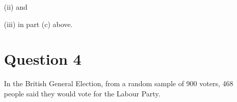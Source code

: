 \documentclass[]{report}
\begin{document}
\begin{enumerate}[(i)]
\begin{itemize}
	
	(c)	An assembly plant has two suppliers, one based in England (E) and the other in Spain (S).  
	60%
	The defect rate in the English plant is 5%
	
	\begin{itemize}
		\item[(i)]	If a component is randomly selected from the production floor in Ireland what is the probability that it will fail?
		\item[(ii)]	If a motherboard fails what is the probability that the component which caused the failure was sourced in England?
	\end{itemize}
	
	
	

	
	
	(c)	XYZ Ltd supplies motherboards to Dell.  You are a production manager with Dell.  There is a constant probability of 0.4 that a board will be defective.  You select 100 boards at random.  Using the log tables for the binomial distribution what is the probability that
	
	\begin{itemize}
		\item[(i)] 0 boards will be defective?
		\item[(ii)] 2 or more boards will be defective?
		\item[(iii)]	5 or less boards will be defective?
	\end{itemize}
	(d)	Use the normal approximation to the binomial to answer (i), \item[(ii)]and \item[(iii)]in part (c) above.
	
	
	\section{Question 4}
	In the British General Election, from a random sample of 900 voters, 468 people said they would vote for the Labour Party.  
	

\end{itemize}
\end{enumerate}
\end{document}
